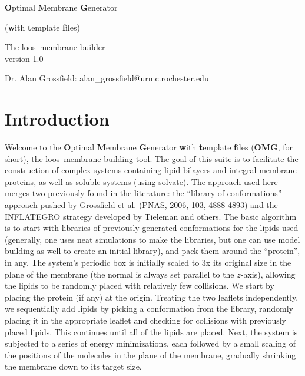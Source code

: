 \documentclass[12pt]{article}
\begin{document}
\newcommand{\loos}{{\sc loos}}
\newcommand{\pyloos}{{\sc PyLoos}}
\newcommand{\namd}{{\sc namd}}
\newcommand{\psfgen}{{\tt psfgen}}
\newcommand{\omgwtf}{{\bf OMG}}
\newcommand{\highlight}[1]{\textcolor{red}{#1}}


\begin{center}
\begin{LARGE}
{\bf O}ptimal {\bf M}embrane {\bf G}enerator \\
\end{LARGE}
\begin{Large}
({\bf w}ith  {\bf t}emplate {\bf f}iles) \\
\end{Large}
\vspace*{0.25in}
\begin{large}
The \loos\ membrane builder \\
version 1.0 \\
\end{large}

\vspace*{0.5in}
Dr. Alan Grossfield: alan\_grossfield@urmc.rochester.edu \\
\end{center}

\newpage

\tableofcontents
\newpage

\section{Introduction}
\label{s:intro}

Welcome to the {\bf O}ptimal {\bf M}embrane {\bf G}enerator {\bf w}ith {\bf
t}emplate {\bf f}iles (\omgwtf, for short), the \loos\ membrane building tool.
The goal of this suite is to facilitate the construction of complex systems
containing lipid bilayers and integral membrane proteins, as well as soluble
systems (using solvate).  The approach used here merges two previously found
in the literature:
the ``library of conformations'' approach pushed by Grossfield et al. (PNAS,
2006, 103, 4888-4893) and the INFLATEGRO strategy developed by Tieleman and
others.  The basic algorithm is to start with libraries of previously generated
conformations for the lipids used (generally, one uses neat simulations to make
the libraries, but one can use model building as well to create an initial
library), and pack them around the ``protein'', in any.  The system's periodic
box is initially scaled to 3x its original size in the plane of the membrane
(the normal is always set parallel to the $z$-axis), allowing the lipids to be
randomly placed with relatively few collisions.  We start by placing the protein
(if any) at the origin. Treating the two leaflets independently, we sequentially
add lipids by picking a conformation from the library, randomly placing it in
the appropriate leaflet and checking for collisions with previously placed
lipids.  This continues until all of the lipids are placed.  Next, the system is
subjected to a series of energy minimizations, each followed by a small scaling
of the positions of the molecules in the plane of the membrane, gradually
shrinking the membrane down to its target size.
\end{document}
